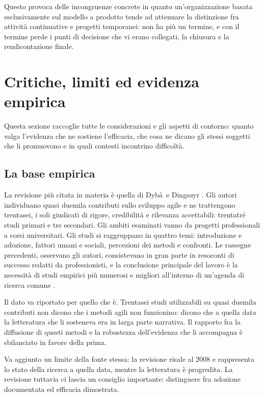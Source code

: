 Questo provoca delle incongruenze concrete in quanto un'organizzazione basata
esclusivamente sul modello a prodotto tende ad attenuare la distinzione fra
attivit\`a continuative e progetti temporanei:
non ha pi\`u un termine, e con il termine perde i punti di decisione che vi
erano collegati, la chiusura e la rendicontazione finale.


\section{Critiche, limiti ed evidenza empirica}
\label{sec:critiche}

Questa sezione raccoglie tutte le considerazioni e gli aspetti di contorno:
quanto valga l'evidenza che ne sostiene l'efficacia, che cosa ne dicano gli
stessi soggetti che li promuovono e in quali contesti incontrino difficolt\`a.

\subsection{La base empirica}

La revisione pi\`u citata in materia \`e quella di Dyb\aa\ e
Dings\o yr \cite{dyba2008}. Gli autori individuano quasi duemila contributi
sullo sviluppo agile e ne trattengono trentasei, i soli giudicati di rigore,
credibilit\`a e rilevanza accettabili: trentatr\'e studi primari e tre
secondari. Gli ambiti esaminati vanno da progetti professionali a corsi
universitari. Gli studi si raggruppano in quattro temi: introduzione e
adozione, fattori umani e sociali, percezioni dei metodi e confronti. Le
rassegne precedenti, osservano gli autori, consistevano in gran parte in
resoconti di successo redatti da professionisti, e la conclusione principale
del lavoro \`e la necessit\`a di studi empirici pi\`u numerosi e migliori
all'interno di un'agenda di ricerca comune \cite{dyba2008}.

Il dato va riportato per quello che \`e. Trentasei studi utilizzabili su quasi
duemila contributi non dicono che i metodi agili non funzionino: dicono che a
quella data la letteratura che li sosteneva era in larga parte narrativa. Il
rapporto fra la diffusione di questi metodi e la robustezza dell'evidenza che
li accompagna \`e sbilanciato in favore della prima.

Va aggiunto un limite della fonte stessa: la revisione risale al 2008 e
rappresenta lo stato della ricerca a quella data, mentre la letteratura \`e progredita.
La revisione tuttavia ci lascia un consiglio importante: distinguere fra adozione documentata
ed efficacia dimostrata.

